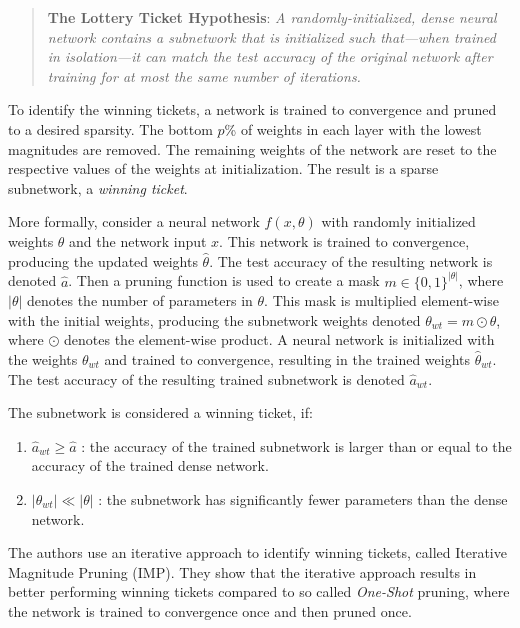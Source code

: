 \begin{quote}
    \textbf{The Lottery Ticket Hypothesis}: \textit{A randomly-initialized, dense neural network contains a subnetwork that is initialized such that—when trained in isolation—it can match the test accuracy of the original network after training for at most the same number of iterations.}~\cite{DBLP:conf/iclr/FrankleC19}
\end{quote}

To identify the winning tickets, a network is trained to convergence and pruned to a desired sparsity. 
The bottom $p$\% of weights in each layer with the lowest magnitudes are removed. 
The remaining weights of the network are reset to the respective values of the weights at initialization.
The result is a sparse subnetwork, a \textit{winning ticket}.

More formally, consider a neural network $f(x, \theta)$ with randomly initialized weights $\theta$ and the network input $x$.
This network is trained to convergence, producing the updated weights $\hat \theta$. The test accuracy of the resulting network is denoted $\hat a$.
Then a pruning function is used to create a mask $m \in \{0,1\}^{|\theta|}$, where $|\theta|$ denotes the number of parameters in $\theta$.
This mask is multiplied element-wise with the initial weights, producing the subnetwork weights denoted $\theta_{wt} = m \odot \theta$, where $\odot$ denotes the element-wise product.
A neural network is initialized with the weights $\theta_{wt}$ and trained to convergence, resulting in the trained weights $\hat \theta_{wt}$. 
The test accuracy of the resulting trained subnetwork is denoted $\hat a_{wt}$.

The subnetwork is considered a winning ticket, if:
\begin{enumerate}
  \item  $\hat a_{wt} \geq \hat a$ :  the accuracy of the trained subnetwork is larger than or equal to the accuracy of the  trained dense network.
  \item $|\theta_{wt}| \ll |\theta|$ : the subnetwork has significantly fewer parameters than the dense network.
\end{enumerate}

The authors use an iterative approach to identify winning tickets, called Iterative Magnitude Pruning (IMP).
They show that the iterative approach results in better performing winning tickets compared to so called \textit{One-Shot} pruning, where the network is trained to convergence once and then pruned once.

